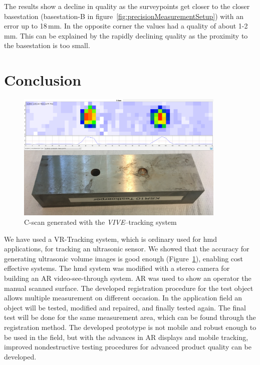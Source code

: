 \documentclass{VRARWorkshop}
\begin{document}
The results show a decline in quality as the surveypoints get closer to the closer basestation (basestation-B in figure~\ref{fig:precisionMeasurementSetup}) with an error up to 18\,mm.
In the opposite corner the values had a quality of about 1-2\,mm.
This can be explained by the rapidly declining quality as the proximity to the basestation is too small.

\section{Conclusion}

\begin{figure}[h!]
    \begin{center}
        \includegraphics[width=100mm]{images/CScanARUS}
        \caption{\label{fig:resultCScan} C-scan generated with the \textit{VIVE}--tracking system}
    \end{center}
\end{figure}

We have used a VR-Tracking system, which is ordinary used for {\sc hmd} applications, for tracking an ultrasonic sensor.
We showed that the accuracy for generating ultrasonic volume images is good enough (Figure~\ref{fig:resultCScan}), enabling cost effective systems.
The {\sc hmd} system was modified with a stereo camera for building an AR video-see-through system.
AR was used to show an operator the manual scanned surface.
The developed registration procedure for the test object allows multiple measurement on different occasion.
In the application field an object will be tested, modified and repaired, and finally tested again.
The final test will be done for the same measurement area, which can be found through the registration method.
The developed prototype is not mobile and robust enough to be used in the field, but with the advances in AR displays and mobile tracking, improved nondestructive testing procedures for advanced product quality can be developed.

\VRARsetbibstyle

\end{document}
